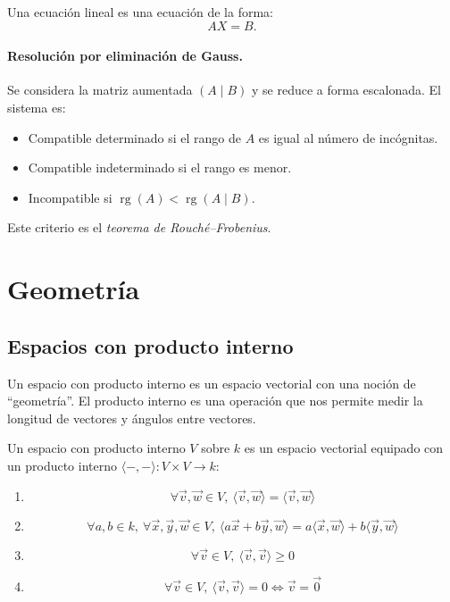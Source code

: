 \documentclass[10pt]{article}
\begin{document}
Una ecuación lineal es una ecuación de la forma:
\[
AX = B.
\]

\paragraph{Resolución por eliminación de Gauss.}

Se considera la matriz aumentada $(A \mid B)$ y se reduce a forma escalonada. El sistema es:
\begin{itemize}
  \item Compatible determinado si el rango de $A$ es igual al número de incógnitas.
  \item Compatible indeterminado si el rango es menor.
  \item Incompatible si $\operatorname{rg}(A) < \operatorname{rg}(A\mid B)$.
\end{itemize}

Este criterio es el \textit{teorema de Rouché–Frobenius}.

\newpage

\section{Geometría}

\subsection{Espacios con producto interno}

Un espacio con producto interno es un espacio vectorial con una noción de ``geometría''. El producto interno es una operación que nos permite medir la longitud de vectores y ángulos
entre vectores.

\begin{definition}
  Un espacio con producto interno $ V $ sobre $ k $ es un espacio vectorial equipado con un producto interno $ \langle -, - \rangle : V \times V \to k $:
  \begin{enumerate}
    \item \[ \forall \vec{v}, \vec{w} \in V,\ \langle \vec{v}, \vec{w} \rangle = \langle \vec{v}, \vec{w} \rangle \]
    \item \[ \forall a, b \in k,\ \forall \vec{x}, \vec{y}, \vec{w} \in V,\ \langle a\vec{x} + b\vec{y}, \vec{w} \rangle = a\langle \vec{x}, \vec{w} \rangle + b\langle \vec{y}, \vec{w} \rangle \]
    \item \[ \forall \vec{v} \in V,\ \langle \vec{v}, \vec{v} \rangle \geq 0 \]
    \item \[ \forall \vec{v} \in V,\ \langle \vec{v}, \vec{v} \rangle = 0 \iff \vec{v} = \vec{0} \]
  \end{enumerate}
\end{definition}
\end{document}
